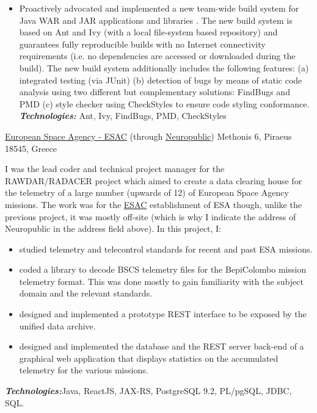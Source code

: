 \documentclass[helvetica,english,logo,notitle,totpages,utf8]{europecv2013}
\newcommand{\technologies}[0]{\textbf{\textit{Technologies:}}}
\begin{document}
\begin{europecv}
{\begin{itemize}
    \item Proactively advocated and implemented a new team-wide build system for Java WAR
      and JAR applications and libraries . The new build system is based on Ant and Ivy
      (with a local file-system based repository) and guarantees
    fully reproducible builds with no Internet connectivity requirements (i.e. no dependencies are accessed or downloaded during
    the build). The new build system
    additionally includes the following features: (a) integrated testing (via JUnit) (b) detection of bugs by means
    of static code analysis using two different but complementary solutions: FindBugs and PMD (c) style checker using
    CheckStyles to ensure code styling conformance. 
      \technologies{} Ant, Ivy, FindBugs, PMD, CheckStyles
    \end{itemize}
                  }

                   {\href{http://www.esac.com}{European Space Agency - ESAC} (through \href{http://www.neuropublic.gr}{Neuropublic})}
                   {Methonis 6, Piraeus 18545, Greece}
                   {
                     I was the lead coder and technical project manager for the RAWDAR/RADACER project which aimed
    to create a data clearing house for the telemetry of a large number (upwards of 12) of European Space Agency
    missions. The work was for the {\href{http://www.esac.com}{ESAC}} establishment of ESA though, unlike the previous project, it was
    mostly off-site (which is why I indicate the address of Neuropublic in the address field above). In this project, I:
  \begin{itemize}
    \item studied telemetry and telecontrol standards for recent and past ESA missions.
    \item coded a library to decode BSCS telemetry files for the BepiColombo mission telemetry format. This was done mostly to gain
      familiarity with the subject domain and the relevant standards.
    \item designed and implemented a prototype REST interface to be exposed by the unified data archive.
    \item designed and implemented the database and the REST server back-end of a graphical web application that displays statistics
      on the accumulated telemetry for the various missions.
  \end{itemize}
  \technologies Java, ReactJS, JAX-RS, PostgreSQL 9.2, PL/pgSQL, JDBC, SQL.
                   }
                   

\end{europecv}
\end{document}
